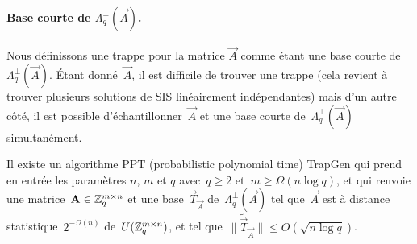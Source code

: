 \paragraph{Base courte de $\Lambda_q^{\perp}(\vec{A})$.}
Nous définissons une trappe pour la matrice $\vec{A}$ comme étant une base courte de~$\Lambda_q^{\perp}(\vec{A})$.
\'Etant donné~$\vec{A}$, il est difficile de trouver une trappe (cela revient à trouver plusieurs solutions de SIS linéairement indépendantes) mais d'un autre côté, il est possible d'échantillonner~$\vec{A}$ et une base courte de~$\Lambda_q^{\perp}(\vec{A})$ simultanément.

\begin{lemma}
\label{le:TrapGen}
Il existe un algorithme PPT (probabilistic polynomial time) \textsf{TrapGen} qui prend en entrée les paramètres $n$, $m$ et $q$ avec~$q \geq 2$ et~$m \geq \Omega(n \log q)$, et qui renvoie une matrice~$\mathbf{A} \in \mathbb{Z}_q^{m \times n}$ et une base~$\vec{T}_{\vec{A}}$ de~$\Lambda_q^{\perp}(\vec{A})$ tel que~$\vec{A}$ est à distance statistique~$2^{-\Omega(n)}$
de~$U(\mathbb{Z}_q^{m \times n})$, et tel que~$\|\widetilde{\vec{T}}_{\vec{A}}\| \leq O(\sqrt{n \log q})$.
\end{lemma}

